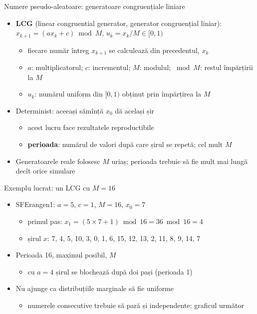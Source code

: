\begin{frame}{Numere pseudo-aleatoare: generatoare congruențiale liniare}
\itemsize{\small}
\begin{itemize}
    \item \textbf{LCG} (linear congruential generator, generator congruențial liniar): $x_{k+1} = (a x_k + c) \bmod M$, $u_k = x_k/M \in [0, 1)$
    \begin{itemize}
        \item fiecare număr întreg $x_{k+1}$ se calculează din precedentul, $x_k$
        \item $a$: multiplicatorul; $c$: incrementul; $M$: modulul; $\bmod M$: restul împărțirii la $M$
        \item $u_k$: numărul uniform din $[0, 1)$ obținut prin împărțirea la $M$
    \end{itemize}
    \item Determinist: aceeași sămînță $x_0$ dă același șir
    \begin{itemize}
        \item acest lucru face rezultatele reproductibile
        \item \textbf{perioada}: numărul de valori după care șirul se repetă; cel mult $M$
    \end{itemize}
    \item Generatoarele reale folosesc $M$ uriaș; perioada trebuie să fie mult mai lungă decît orice simulare
\end{itemize}
\end{frame}

\begin{frame}{Exemplu lucrat: un LCG cu $M = 16$}
\itemsize{\small}
\begin{itemize}
    \item SFErangen1: $a = 5$, $c = 1$, $M = 16$, $x_0 = 7$
    \begin{itemize}
        \item primul pas: $x_1 = (5 \times 7 + 1) \bmod 16 = 36 \bmod 16 = 4$
        \item șirul $x$: 7, 4, 5, 10, 3, 0, 1, 6, 15, 12, 13, 2, 11, 8, 9, 14, 7
    \end{itemize}
    \item Perioada 16, maximul posibil, $M$
    \begin{itemize}
        \item cu $a = 4$ șirul se blochează după doi pași (perioada 1)
    \end{itemize}
    \item Nu ajunge ca distribuțiile marginale să fie uniforme
    \begin{itemize}
        \item numerele consecutive trebuie să pară și independente: graficul următor
    \end{itemize}
\end{itemize}
\end{frame}

